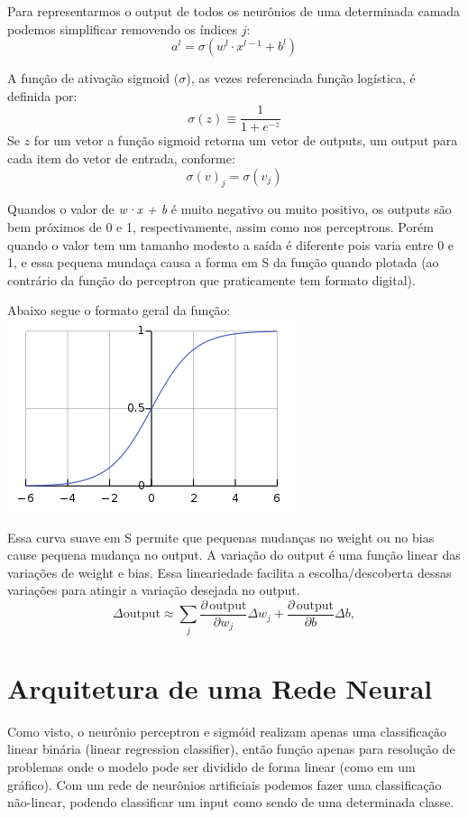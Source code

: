 \documentclass[11pt,a4paper,leqno]{article}
\begin{document}
Para representarmos o output de todos os neurônios de uma determinada camada podemos simplificar removendo os índices $j$:
\[
 a^l = \sigma(w^l \cdot x^{l-1} + b^l)
\]


A função de ativação sigmoid ($\sigma$), as vezes referenciada função logística, é definida por:
\[
 \sigma(z) \equiv \frac{1}{1+e^{-z}}
\]
Se $z$ for um vetor a função sigmoid retorna um vetor de outputs, um output para cada item do vetor de entrada, conforme:
\[ \sigma(v)_j = \sigma(v_j) \]

Quandos o valor de \emph{w·x + b} é muito negativo ou muito positivo, os outputs são bem próximos de 0 e 1, respectivamente, assim como nos perceptrons. Porém quando o valor tem um tamanho modesto a saída é diferente pois varia entre 0 e 1, e essa pequena mundaça causa a forma em S da função quando plotada (ao contrário da função do perceptron que praticamente tem formato digital).

Abaixo segue o formato geral da função:\\
\includegraphics[scale=0.4]{Images/conjunto_imagem_funcao_ativacao_sigmoid.png} 

Essa curva suave em S permite que pequenas mudanças no weight ou no bias cause pequena mudança no output.
A variação do output é uma função linear das variações de weight e bias. Essa lineariedade facilita a escolha/descoberta dessas variações para atingir a variação desejada no output.
\[
  \Delta \mbox{output} \approx \sum_j \frac{\partial \, \mbox{output}}{\partial w_j}
  \Delta w_j + \frac{\partial \, \mbox{output}}{\partial b} \Delta b,
\]


\newpage
\section{Arquitetura de uma Rede Neural}

Como visto, o neurônio perceptron e sigmóid realizam apenas uma classificação linear binária (linear regression classifier), então função apenas para resolução de problemas onde o modelo pode ser dividido de forma linear (como em um gráfico).
Com um rede de neurônios artificiais podemos fazer uma classificação não-linear, podendo classificar um input como sendo de uma determinada classe.
\end{document}
